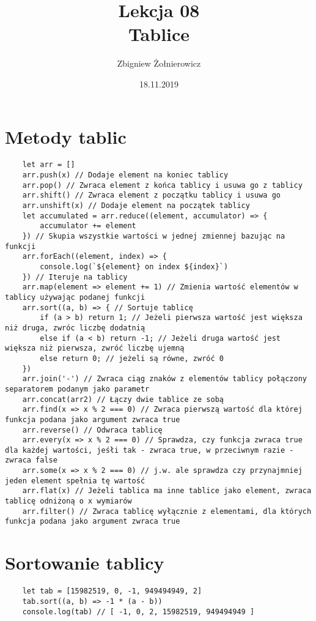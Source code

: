 \documentclass[a4paper]{article}
\begin{document}
\title{{\huge Lekcja 08} \\
    {\Large Tablice}}
\author{Zbigniew Żołnierowicz}
\date{18.11.2019}
\maketitle
\section{Metody tablic}
\begin{verbatim}
    let arr = []
    arr.push(x) // Dodaje element na koniec tablicy
    arr.pop() // Zwraca element z końca tablicy i usuwa go z tablicy
    arr.shift() // Zwraca element z początku tablicy i usuwa go
    arr.unshift(x) // Dodaje element na początek tablicy
    let accumulated = arr.reduce((element, accumulator) => {
        accumulator += element 
    }) // Skupia wszystkie wartości w jednej zmiennej bazując na funkcji
    arr.forEach((element, index) => {
        console.log(`${element} on index ${index}`)
    }) // Iteruje na tablicy
    arr.map(element => element += 1) // Zmienia wartość elementów w tablicy używając podanej funkcji
    arr.sort((a, b) => { // Sortuje tablicę
        if (a > b) return 1; // Jeżeli pierwsza wartość jest większa niż druga, zwróc liczbę dodatnią
        else if (a < b) return -1; // Jeżeli druga wartość jest większa niż pierwsza, zwróć liczbę ujemną
        else return 0; // jeżeli są równe, zwróć 0
    })
    arr.join('-') // Zwraca ciąg znaków z elementów tablicy połączony separatorem podanym jako parametr
    arr.concat(arr2) // Łączy dwie tablice ze sobą
    arr.find(x => x % 2 === 0) // Zwraca pierwszą wartość dla której funkcja podana jako argument zwraca true
    arr.reverse() // Odwraca tablicę
    arr.every(x => x % 2 === 0) // Sprawdza, czy funkcja zwraca true dla każdej wartości, jeśłi tak - zwraca true, w przeciwnym razie - zwraca false
    arr.some(x => x % 2 === 0) // j.w. ale sprawdza czy przynajmniej jeden element spełnia tę wartość
    arr.flat(x) // Jeżeli tablica ma inne tablice jako element, zwraca tablicę odniżoną o x wymiarów
    arr.filter() // Zwraca tablicę wyłącznie z elementami, dla których funkcja podana jako argument zwraca true
\end{verbatim}
\section{Sortowanie tablicy}
\begin{verbatim}
    let tab = [15982519, 0, -1, 949494949, 2]
    tab.sort((a, b) => -1 * (a - b))
    console.log(tab) // [ -1, 0, 2, 15982519, 949494949 ]
\end{verbatim}
\end{document}
